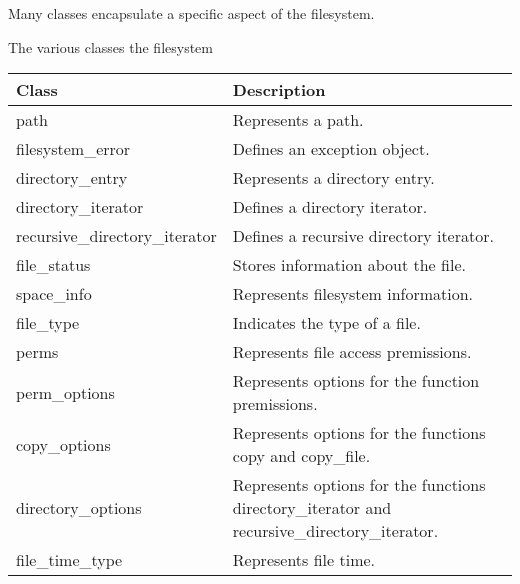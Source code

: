 Many classes encapsulate a specific aspect of the filesystem.

\begin{center}
The various classes the filesystem
\end{center}

\begin{longtable}[c]{|l|l|}
\hline
\textbf{Class}                 & \textbf{Description}                                      \\ \hline
\endfirsthead
%
\endhead
%
path                           & Represents a path.                                        \\ \hline
filesystem\_error              & Defines an exception object.                              \\ \hline
directory\_entry               & Represents a directory entry.                             \\ \hline
directory\_iterator            & Defines a directory iterator.                             \\ \hline
recursive\_directory\_iterator & Defines a recursive directory iterator.                   \\ \hline
file\_status                   & Stores information about the file.                        \\ \hline
space\_info                    & Represents filesystem information.                        \\ \hline
file\_type                     & Indicates the type of a file.                             \\ \hline
perms                          & Represents file access premissions.                       \\ \hline
perm\_options                  & Represents options for the function premissions.          \\ \hline
copy\_options                  & Represents options for the functions copy and copy\_file. \\ \hline
directory\_options & Represents options for the functions directory\_iterator and recursive\_directory\_iterator. \\ \hline
file\_time\_type               & Represents file time.                                     \\ \hline
\end{longtable}


